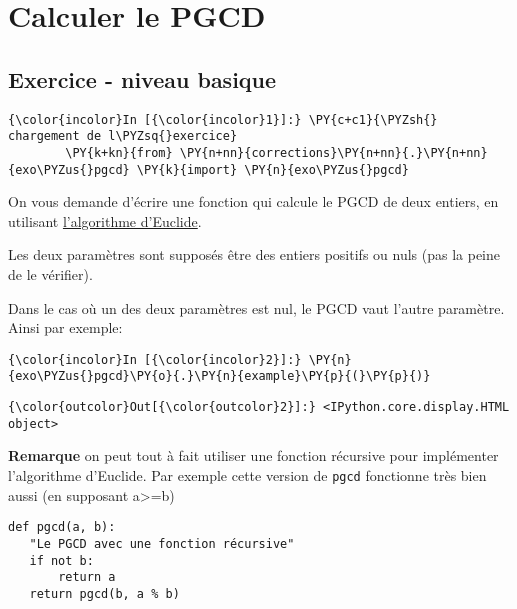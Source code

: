     
    
    
    

    

    \hypertarget{calculer-le-pgcd}{%
\section{Calculer le PGCD}\label{calculer-le-pgcd}}

    \hypertarget{exercice---niveau-basique}{%
\subsection{Exercice - niveau basique}\label{exercice---niveau-basique}}

    \begin{Verbatim}[commandchars=\\\{\}]
{\color{incolor}In [{\color{incolor}1}]:} \PY{c+c1}{\PYZsh{} chargement de l\PYZsq{}exercice}
        \PY{k+kn}{from} \PY{n+nn}{corrections}\PY{n+nn}{.}\PY{n+nn}{exo\PYZus{}pgcd} \PY{k}{import} \PY{n}{exo\PYZus{}pgcd}
\end{Verbatim}


    On vous demande d'écrire une fonction qui calcule le PGCD de deux
entiers, en utilisant
\href{http://fr.wikipedia.org/wiki/Algorithme_d'Euclide}{l'algorithme
d'Euclide}.

    Les deux paramètres sont supposés être des entiers positifs ou nuls (pas
la peine de le vérifier).

Dans le cas où un des deux paramètres est nul, le PGCD vaut l'autre
paramètre. Ainsi par exemple:

    \begin{Verbatim}[commandchars=\\\{\}]
{\color{incolor}In [{\color{incolor}2}]:} \PY{n}{exo\PYZus{}pgcd}\PY{o}{.}\PY{n}{example}\PY{p}{(}\PY{p}{)}
\end{Verbatim}


\begin{Verbatim}[commandchars=\\\{\}]
{\color{outcolor}Out[{\color{outcolor}2}]:} <IPython.core.display.HTML object>
\end{Verbatim}
            
    \textbf{Remarque} on peut tout à fait utiliser une fonction récursive
pour implémenter l'algorithme d'Euclide. Par exemple cette version de
\texttt{pgcd} fonctionne très bien aussi (en supposant
a\textgreater{}=b)

\begin{verbatim}
def pgcd(a, b):
   "Le PGCD avec une fonction récursive"
   if not b:
       return a
   return pgcd(b, a % b)
\end{verbatim}

